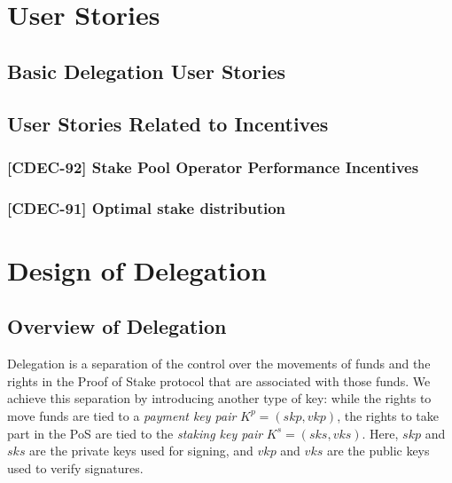 \documentclass[11pt,a4paper]{article}
\begin{document}
\section{User Stories}\label{user-stories}

\subsection{Basic Delegation User
Stories}\label{basic-delegation-user-stories}


\subsection{User Stories Related to
Incentives}\label{user-stories-related-to-incentives}

\subsubsection{{[}CDEC-92{]} Stake Pool Operator Performance
Incentives}\label{cdec-92-stake-pool-operator-performance-incentives}

\subsubsection{{[}CDEC-91{]} Optimal stake
distribution}\label{cdec-91-optimal-stake-distribution}


\section{Design of Delegation}\label{design-of-delegation}

\subsection{Overview of Delegation}\label{overview-of-delegation}

Delegation is a separation of the control over the movements of funds
and the rights in the Proof of Stake protocol that are associated with
those funds. We achieve this separation by introducing another type of
key: while the rights to move funds are tied to a \emph{payment key
pair} \(K^p=(skp, vkp)\), the rights to take part in the PoS are tied to
the \emph{staking key pair} \(K^s=(sks, vks)\). Here, \(skp\) and
\(sks\) are the private keys used for signing, and \(vkp\) and \(vks\)
are the public keys used to verify signatures.
\end{document}
